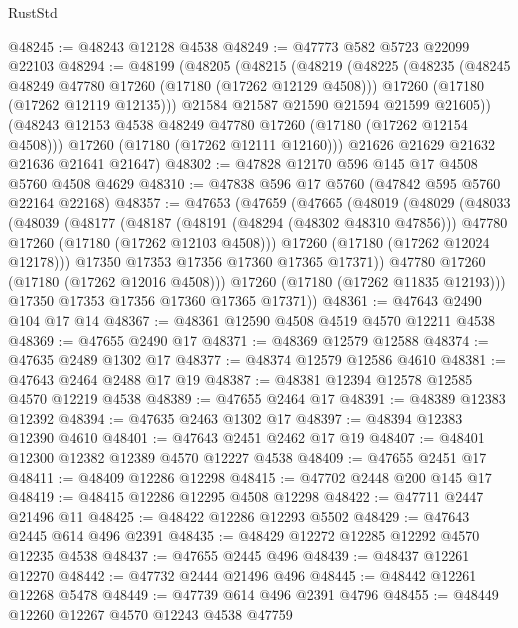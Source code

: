 \begin{lexlean}{RustStd}
\begin{coremodule}
@48245 := @48243 @12128 @4538
@48249 := @47773 @582 @5723 @22099 @22103
@48294 := @48199
    (@48205
      (@48215
        (@48219
          (@48225
            (@48235
              (@48245 @48249 @47780 @17260 (@17180 (@17262 @12129 @4508)))
              @17260
              (@17180 (@17262 @12119 @12135)))
            @21584
            @21587
            @21590
            @21594
            @21599
            @21605))
        (@48243 @12153 @4538 @48249 @47780 @17260 (@17180 (@17262 @12154 @4508)))
        @17260
        (@17180 (@17262 @12111 @12160)))
      @21626
      @21629
      @21632
      @21636
      @21641
      @21647)
@48302 := @47828 @12170 @596 @145 @17 @4508 @5760 @4508 @4629
@48310 := @47838 @596 @17 @5760 (@47842 @595 @5760 @22164 @22168)
@48357 := @47653
    (@47659
      (@47665
        (@48019
          (@48029
            (@48033
              (@48039
                (@48177
                  (@48187
                    (@48191 (@48294 (@48302 @48310 @47856)))
                    @47780
                    @17260
                    (@17180 (@17262 @12103 @4508)))
                  @17260
                  (@17180 (@17262 @12024 @12178)))
                @17350
                @17353
                @17356
                @17360
                @17365
                @17371))
            @47780
            @17260
            (@17180 (@17262 @12016 @4508)))
          @17260
          (@17180 (@17262 @11835 @12193)))
        @17350
        @17353
        @17356
        @17360
        @17365
        @17371))
@48361 := @47643 @2490 @104 @17 @14
@48367 := @48361 @12590 @4508 @4519 @4570 @12211 @4538
@48369 := @47655 @2490 @17
@48371 := @48369 @12579 @12588
@48374 := @47635 @2489 @1302 @17
@48377 := @48374 @12579 @12586 @4610
@48381 := @47643 @2464 @2488 @17 @19
@48387 := @48381 @12394 @12578 @12585 @4570 @12219 @4538
@48389 := @47655 @2464 @17
@48391 := @48389 @12383 @12392
@48394 := @47635 @2463 @1302 @17
@48397 := @48394 @12383 @12390 @4610
@48401 := @47643 @2451 @2462 @17 @19
@48407 := @48401 @12300 @12382 @12389 @4570 @12227 @4538
@48409 := @47655 @2451 @17
@48411 := @48409 @12286 @12298
@48415 := @47702 @2448 @200 @145 @17
@48419 := @48415 @12286 @12295 @4508 @12298
@48422 := @47711 @2447 @21496 @11
@48425 := @48422 @12286 @12293 @5502
@48429 := @47643 @2445 @614 @496 @2391
@48435 := @48429 @12272 @12285 @12292 @4570 @12235 @4538
@48437 := @47655 @2445 @496
@48439 := @48437 @12261 @12270
@48442 := @47732 @2444 @21496 @496
@48445 := @48442 @12261 @12268 @5478
@48449 := @47739 @614 @496 @2391 @4796
@48455 := @48449 @12260 @12267 @4570 @12243 @4538 @47759

\end{coremodule}
\end{lexlean}
